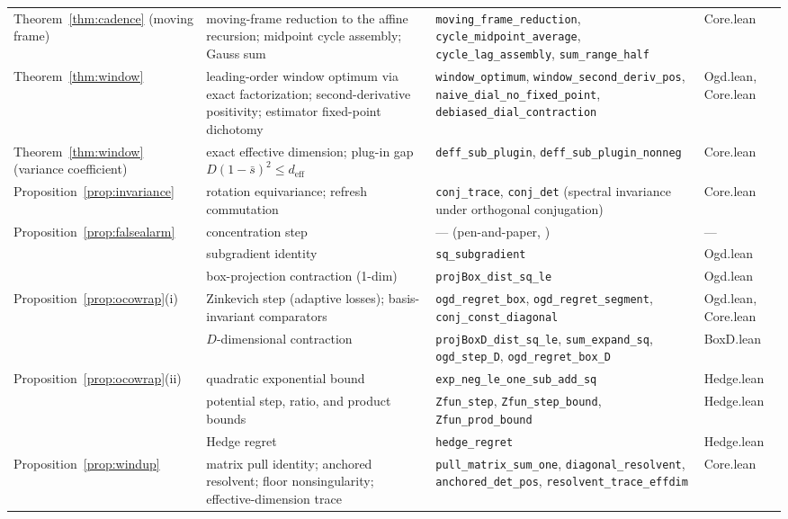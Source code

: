 {\begin{longtable}{@{}p{1.02in} p{1.12in} p{1.9in} l@{}}
Theorem~\ref{thm:cadence} (moving frame) & moving-frame reduction to the affine recursion; midpoint cycle assembly; Gauss sum & \texttt{moving\_frame\_reduction}, \texttt{cycle\_midpoint\_average}, \texttt{cycle\_lag\_assembly}, \texttt{sum\_range\_half} & Core.lean \\
Theorem~\ref{thm:window} & leading-order window optimum via exact factorization; second-derivative positivity; estimator fixed-point dichotomy & \texttt{window\_optimum}, \texttt{window\_second\_deriv\_pos}, \texttt{naive\_dial\_no\_fixed\_point}, \texttt{debiased\_dial\_contraction} & Ogd.lean, Core.lean \\
Theorem~\ref{thm:window} (variance coefficient) & exact effective dimension; plug-in gap $D(1-\bar s)^2 \le d_{\mathrm{eff}}$ & \texttt{deff\_sub\_plugin}, \texttt{deff\_sub\_plugin\_nonneg} & Core.lean \\
Proposition~\ref{prop:invariance} & rotation equivariance; refresh commutation & \texttt{conj\_trace}, \texttt{conj\_det} (spectral invariance under orthogonal conjugation) & Core.lean \\
Proposition~\ref{prop:falsealarm} & concentration step & --- (pen-and-paper, \citep{freedman1975}) & --- \\
 & subgradient identity & \texttt{sq\_subgradient} & Ogd.lean \\
 & box-projection contraction (1-dim) & \texttt{projBox\_dist\_sq\_le} & Ogd.lean \\
Proposition~\ref{prop:ocowrap}(i) & Zinkevich step (adaptive losses); basis-invariant comparators & \texttt{ogd\_regret\_box}, \texttt{ogd\_regret\_segment}, \texttt{conj\_const\_diagonal} & Ogd.lean, Core.lean \\
 & $D$-dimensional contraction & \texttt{projBoxD\_dist\_sq\_le}, \texttt{sum\_expand\_sq}, \texttt{ogd\_step\_D}, \texttt{ogd\_regret\_box\_D} & BoxD.lean \\
Proposition~\ref{prop:ocowrap}(ii) & quadratic exponential bound & \texttt{exp\_neg\_le\_one\_sub\_add\_sq} & Hedge.lean \\
 & potential step, ratio, and product bounds & \texttt{Zfun\_step}, \texttt{Zfun\_step\_bound}, \texttt{Zfun\_prod\_bound} & Hedge.lean \\
 & Hedge regret & \texttt{hedge\_regret} & Hedge.lean \\
Proposition~\ref{prop:windup} & matrix pull identity; anchored resolvent; floor nonsingularity; effective-dimension trace & \texttt{pull\_matrix\_sum\_one}, \texttt{diagonal\_resolvent}, \texttt{anchored\_det\_pos}, \texttt{resolvent\_trace\_effdim} & Core.lean \\

\end{longtable}}
